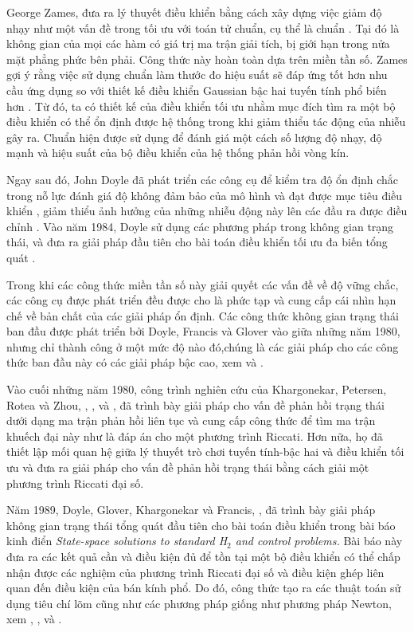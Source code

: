 \documentclass[12pt,a4paper]{article}
\theoremstyle{definition}
\newcommand{\hinf}{\text{\emph{H$_\infty$ }}}
\begin{document}
\medskip
George Zames, \cite{23} đưa ra lý thuyết điều khiển \hinf bằng cách xây dựng việc giảm độ nhạy như một vấn đề trong tối ưu với toán tử chuẩn, cụ thể là chuẩn \hinf  \cite{15}. Tại đó \hinf là không gian của mọi các hàm có giá trị ma trận giải tích, bị giới hạn trong nửa mặt phẳng phức bên phải. Công thức này hoàn toàn dựa trên miền tần số. Zames gợi ý rằng việc sử dụng chuẩn \hinf làm thước đo hiệu suất sẽ đáp ứng tốt hơn nhu cầu ứng dụng so với thiết kế điều khiển Gaussian bậc hai tuyến tính phổ biến hơn \cite{25}. Từ đó, ta có thiết kế của điều khiển tối ưu \hinf  nhằm mục đích tìm ra một bộ điều khiển có thể ổn định được hệ thống trong khi giảm thiểu tác động của nhiễu gây ra. Chuẩn \hinf hiện được sử dụng để đánh giá một cách số lượng độ nhạy, độ mạnh và hiệu suất của bộ điều khiển của hệ thống phản hồi vòng kín.

\medskip
Ngay sau đó, John Doyle đã phát triển các công cụ để kiểm tra độ ổn định chắc trong nỗ lực đánh giá độ không đảm bảo của mô hình và đạt được mục tiêu điều khiển \hinf , giảm thiểu ảnh hưởng của những nhiễu động này lên các đầu ra được điều chỉnh \cite{18}. Vào năm 1984, Doyle sử dụng các phương pháp trong không gian trạng thái, và đưa ra giải pháp đầu tiên cho bài toán điều khiển tối ưu \hinf đa biến tổng quát \cite{6}.

\bigskip
Trong khi các công thức miền tần số này giải quyết các vấn đề về độ vững chắc, các công cụ được phát triển đều được cho là phức tạp và cung cấp cái nhìn hạn chế về bản chất của các giải pháp ổn định. Các công thức không gian trạng thái ban đầu được phát triển bởi Doyle, Francis và Glover vào giữa những năm 1980, nhưng chỉ thành công ở một mức độ nào đó,chúng là các giải pháp cho các công thức ban đầu này có các giải pháp bậc cao, xem \cite{8} và \cite{11}.

\bigskip
Vào cuối những năm 1980, công trình nghiên cứu của Khargonekar, Petersen, Rotea và Zhou, \cite{13}, \cite{14}, và \cite{20}, đã trình bày giải pháp cho vấn đề phản hồi trạng thái \hinf dưới dạng ma trận phản hồi liên tục và cung cấp công thức để tìm ma trận khuếch đại này như là đáp án cho một phương trình Riccati. Hơn nữa, họ đã thiết lập mối quan hệ giữa lý thuyết trò chơi tuyến tính-bậc hai và điều khiển tối ưu \hinf và đưa ra giải pháp cho vấn đề phản hồi trạng thái bằng cách giải một phương trình Riccati đại số.

\medskip
Năm 1989, Doyle, Glover, Khargonekar và Francis, \cite{7}, đã trình bày giải pháp không gian trạng thái tổng quát đầu tiên cho bài toán điều khiển \hinf trong bài báo kinh điển \emph{State-space solutions to standard \emph{H$_2$} and \hinf control problems.} Bài báo này đưa ra các kết quả cần và điều kiện đủ để tồn tại một bộ điều khiển có thể chấp nhận được các nghiệm của phương trình Riccati đại số và điều kiện ghép liên quan đến điều kiện của bán kính phổ. Do đó, công thức tạo ra các thuật toán sử dụng tiêu chí lõm cũng như các phương pháp giống như phương pháp Newton, xem \cite{9}, \cite{10}, và \cite{21}.
\end{document}
